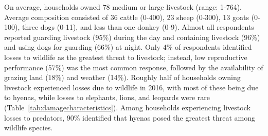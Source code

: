 \documentclass[12pt,]{article}
\begin{document}
On average, households owned 78 medium or large livestock (range: 1-764). Average composition consisted of 36 cattle (0-400), 23 sheep (0-300), 13 goats (0-100), three dogs (0-11), and less than one donkey (0-9). Almost all respondents reported guarding livestock (95\%) during the day and containing livestock (96\%) and using dogs for guarding (66\%) at night. Only 4\% of respondents identified losses to wildlife as the greatest threat to livestock; instead, low reproductive performance (57\%) was the most common response, followed by the availability of grazing land (18\%) and weather (14\%). Roughly half of households owning livestock experienced losses due to wildlife in 2016, with most of these being due to hyenas, while losses to elephants, lions, and leopards were rare (Table~\ref{tab:damagecharacteristics}). Among households experiencing livestock losses to predators, 90\% identified that hyenas posed the greatest threat among wildlife species.
\end{document}
